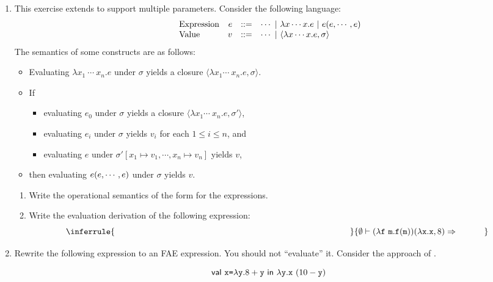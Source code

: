 \begin{enumerate}
\item This exercise extends \lang to support multiple parameters.
Consider the following language:
\[
\begin{array}{lrrl}
  \text{Expression}& e & ::= & \cdots\ |\ \lambda x\cdots x.e\ |\
  e(e,\cdots,e)\\
  \text{Value}& v & ::= & \cdots\ |\ \langle\lambda x\cdots x.e,\sigma\rangle \\
\end{array}
\]
The semantics of some constructs are as follows:
\begin{itemize}
  \item Evaluating $\lambda x_1\ \cdots\ x_n. e$ under $\sigma$
      yields a closure $\langle \lambda x_1 \cdots\ x_n.e,\sigma \rangle$.
  \item If
    \begin{itemize}
    \item evaluating $e_0$ under $\sigma$ yields a closure $\langle \lambda x_1
      \cdots\ x_n.e,\sigma' \rangle$,
    \item evaluating $e_i$ under $\sigma$ yields $v_i$ for each $1 \leq i \leq
      n$, and
    \item evaluating $e$ under $\sigma'[x_1 \mapsto v_1, \cdots, x_n \mapsto
      v_n]$ yields $v$,
    \end{itemize}
\item[] then evaluating $e(e,\cdots,e)$ under $\sigma$ yields $v$.
\end{itemize}

\begin{enumerate}
  \item Write the operational semantics of the form  for the expressions.
  \item Write the evaluation derivation of the following expression:
\[
\inferrule
{ \hspace*{0.8\textwidth} }
{
  \eval{\emptyset}{
    \eappfo{(\efun{\code{f}\
    \code{m}}{\eappfo{\code{f}}{\code{m}}})}{\efun{\cx}{\cx},8}
  }{~~~~~~~~~~}
}
\]
\end{enumerate}

\item Rewrite the following \lang expression to an \textsf{FAE} expression.
  You should not ``evaluate'' it. Consider the approach of .

\[
  \textsf{val}\ \texttt{x}\texttt{=}\lambda\texttt{y}.8+\texttt{y}\ \textsf{in}\ \lambda\texttt{y}.\texttt{x}\ (10-\texttt{y})\ \]


\end{enumerate}
